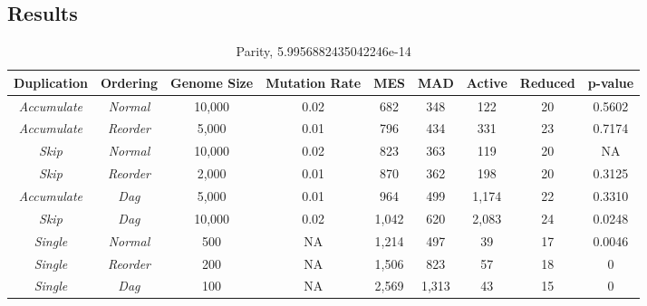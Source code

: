 \documentclass[journal]{IEEEtran}
\begin{document}
\subsection{Results}

\begin{table*}
	\centering
	\begin{tabular}{|c|c|c|c|c|c|c|c|c|}
	  \hline
\textbf{Duplication} & \textbf{Ordering} & \textbf{Genome Size} & \textbf{Mutation Rate} & \textbf{MES} & \textbf{MAD} & \textbf{Active} & \textbf{Reduced} & \textbf{p-value} \\ \hline
\emph{Accumulate} & \emph{Normal} & 10,000 & 0.02 & 682 & 348 & 122 & 20 & 0.5602 \\ \hline
\emph{Accumulate} & \emph{Reorder}&  5,000 & 0.01 & 796 & 434 & 331 & 23 & 0.7174 \\ \hline
\rowcolor{Gray}
\emph{Skip} & \emph{Normal}       & 10,000 & 0.02 & 823 & 363 & 119 & 20 & NA \\ \hline
\emph{Skip} & \emph{Reorder}      &  2,000 & 0.01 & 870 & 362 & 198 & 20 & 0.3125 \\ \hline
\emph{Accumulate} & \emph{Dag}    &  5,000 & 0.01 & 964 & 499 & 1,174 & 22 & 0.3310 \\ \hline
\emph{Skip} & \emph{Dag}          & 10,000 & 0.02 & 1,042 & 620 & 2,083 & 24 & 0.0248 \\ \hline
\emph{Single} & \emph{Normal}     & 500 & NA & 1,214 & 497 & 39 & 17 & 0.0046 \\ \hline
\emph{Single} & \emph{Reorder}    & 200 & NA & 1,506 & 823 & 57 & 18 & 0 \\ \hline
\emph{Single} & \emph{Dag}        & 100 & NA & 2,569 & 1,313 & 43 & 15 & 0 \\ \hline
	\end{tabular}
	\caption{Parity, 5.9956882435042246e-14}
	\label{tab:parity}
\end{table*}
\end{document}
